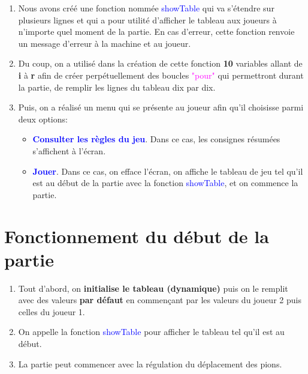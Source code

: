 \documentclass[20pt]{report}
\begin{document}
\begin{flushleft}
\begin{enumerate}
\begin{itemize}
	  \end{itemize}
	 \vspace{3\baselineskip}
	 \item Nous avons créé une fonction nommée \textcolor{blue}{showTable} qui va s'étendre sur plusieurs lignes et qui a pour utilité d'afficher le tableau aux joueurs à n'importe quel moment de la partie. \newline
	 En  cas d'erreur, cette fonction  renvoie un message d'erreur à la machine et au joueur.
	\vspace{3\baselineskip}
	\item Du coup, on a utilisé dans la création de cette fonction \textbf{10} variables allant de \textbf{i} à \textbf{r} afin de créer perpétuellement des boucles \textcolor{magenta}{"pour"} qui permettront durant la partie, de remplir les lignes du tableau dix par dix.
	\vspace{3\baselineskip}
	\item Puis, on a réalisé un menu qui se présente au joueur afin qu'il choisisse parmi deux options:
	  \begin{itemize}%
	    \item \textcolor{blue}{\textbf{Consulter les règles du jeu}}. Dans ce cas, les consignes résumées s'affichent à l'écran.
	    \item \textcolor{blue}{\textbf{Jouer}}. Dans ce cas, on efface l'écran, on affiche le tableau de jeu tel qu'il est au début de la partie avec la fonction \textcolor{blue}{showTable}, et on commence la partie.
	  \end{itemize}
	  \end{enumerate}
	 \vspace{3\baselineskip}
	 \section*{Fonctionnement du début de la partie}
	  \begin{enumerate}
	 		\item Tout d'abord, on \textbf{initialise le tableau (dynamique)} puis on le remplit avec des valeurs \textbf{par défaut} en commençant par les valeurs du joueur 2 puis celles du joueur 1.
			\item On appelle la fonction \textcolor{blue}{showTable} pour afficher le tableau tel qu'il est au début.
			\item La partie peut commencer avec la régulation du déplacement des pions.
	  \end{enumerate}
   
 
 
   
   \end{flushleft}
    
\end{document}
